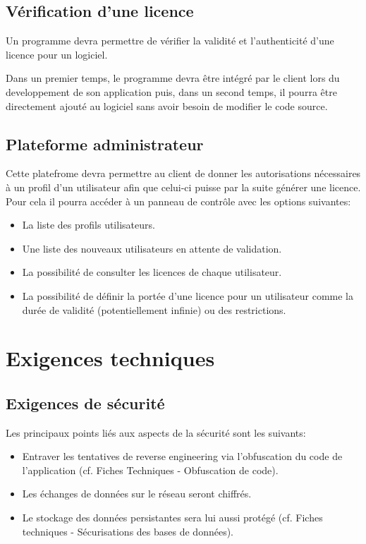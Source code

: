 \section{Vérification d'une licence}
Un programme devra permettre de vérifier la validité et l'authenticité d'une licence pour un logiciel. \newline

Dans un premier temps, le programme devra être intégré par le client lors du developpement de son application puis, dans un second temps, il pourra être directement ajouté au logiciel sans avoir besoin de modifier le code source.

\section{Plateforme administrateur}
Cette platefrome devra permettre au client de donner les autorisations nécessaires à un profil d'un utilisateur afin que celui-ci puisse par la suite générer une licence.
Pour cela il pourra accéder à un panneau de contrôle avec les options suivantes:

\begin{itemize}
	\item La liste des profils utilisateurs.
	\item Une liste des nouveaux utilisateurs en attente de validation.
	\item La possibilité de consulter les licences de chaque utilisateur.
	\item La possibilité de définir la portée d'une licence pour un utilisateur comme la durée de validité (potentiellement infinie) ou des restrictions.
\end{itemize}
\newpage

\chapter{Exigences techniques}

\section{Exigences de sécurité}
Les principaux points liés aux aspects de la sécurité sont les suivants:
\begin{itemize}
	\item Entraver les tentatives de reverse engineering via l'obfuscation du code de l'application (cf. Fiches Techniques - Obfuscation de code).
	\item Les échanges de données sur le réseau seront chiffrés.
	\item Le stockage des données persistantes sera lui aussi protégé (cf. Fiches techniques - Sécurisations des bases de données).
\end{itemize}

